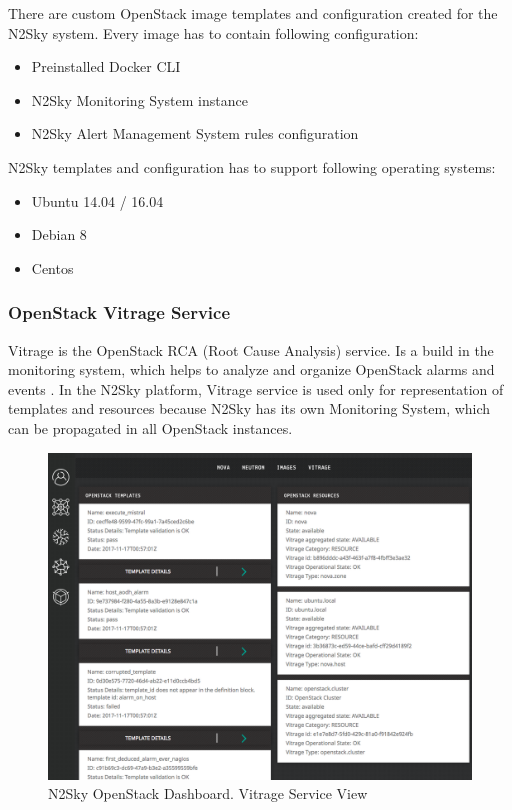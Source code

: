 There are custom OpenStack image templates and configuration created for the N2Sky system. Every image has to contain following configuration:
\begin{itemize}
\item Preinstalled Docker CLI
\item N2Sky Monitoring System instance
\item N2Sky Alert Management System rules configuration
\end{itemize}

N2Sky templates and configuration has to support following operating systems:
\begin{itemize}
\item Ubuntu 14.04 / 16.04 
\item Debian 8
\item Centos
\end{itemize}



\subsubsection{OpenStack Vitrage Service}\label{OpenStack Vitrage Service}

Vitrage is the OpenStack RCA (Root Cause Analysis) service. Is a build in the monitoring system, which helps to analyze and organize OpenStack alarms and events \cite{wiki:vitrage}. In the N2Sky platform, Vitrage service is used only for representation of templates and resources because N2Sky has its own Monitoring System, which can be propagated in all OpenStack instances.  

\begin{figure}[H]
\begin{center}
  \includegraphics[width=\linewidth]{components/4/pics/opentack_vitrage.png}
  \caption{N2Sky OpenStack Dashboard. Vitrage Service View}
  \label{fig:opentack_vitrage}
\end{center}
\end{figure}

